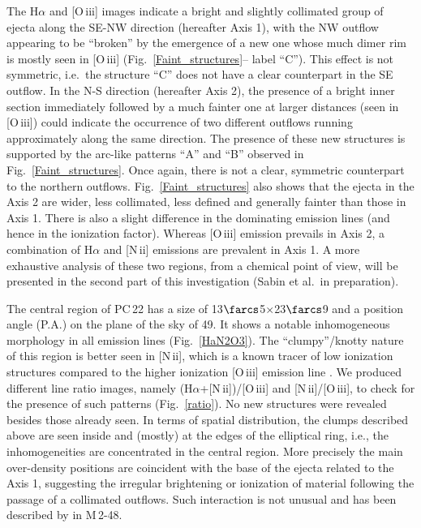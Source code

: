 \documentclass[fleqn,usenatbib,useAMS]{mnras}
\begin{document}
The H$\alpha$ and [O\,{\sc iii}] images indicate a bright and slightly
collimated group of ejecta along the SE-NW direction (hereafter Axis 1),
with the NW outflow appearing to be ``broken'' by the emergence of a new
one whose much dimer rim is mostly seen in [O\,{\sc iii}]
(Fig.~\ref{Faint_structures}-- label ``C'').
This effect is not symmetric, i.e.\ the structure ``C'' does not have a
clear counterpart in the SE outflow.
In the N-S direction (hereafter Axis 2), the presence of a bright inner
section immediately followed by a much fainter one at larger distances
(seen in [O\,{\sc iii}]) could indicate the occurrence of two different
outflows running approximately along the same direction.
The presence of these new structures is supported by the arc-like patterns
``A'' and ``B'' observed in Fig.~\ref{Faint_structures}.
Once again, there is not a clear, symmetric counterpart to the northern
outflows.   
Fig.~\ref{Faint_structures} also shows that the ejecta in the Axis 2
are wider, less collimated, less defined and generally fainter than
those in Axis 1.
There is also a slight difference in the dominating emission lines (and
hence in the ionization factor).
Whereas [O\,{\sc iii}] emission prevails in Axis 2, a combination of
H$\alpha$ and [N\,{\sc ii}] emissions are prevalent in Axis 1.
A more exhaustive analysis of these two regions, from a chemical point
of view, will be presented in the second part of this investigation
(Sabin et al.\ in preparation).


The central region of PC\,22 has a size of 13$\farcs$5$\times$23$\farcs$9
and a position angle (P.A.) on the plane of the sky of 49\degr.
It shows a notable inhomogeneous morphology in all emission lines
(Fig.~\ref{HaN2O3}).
The ``clumpy''/knotty nature of this region is better seen in [N\,{\sc ii}],
which is a known tracer of low ionization structures compared to the higher
ionization [O\,{\sc iii}] emission line \citep{Corradi1996}.
We produced different line ratio images, namely (H$\alpha$+[N\,{\sc ii}])/[O\,{\sc iii}] and [N\,{\sc ii}]/[O\,{\sc iii}], to check for the presence of such patterns (Fig.~\ref{ratio}).
No new structures were revealed besides those already seen.
In terms of spatial distribution, the clumps described above are seen
inside and (mostly) at the edges of the elliptical ring, i.e., the
inhomogeneities are concentrated in the central region.
More precisely the main over-density positions are coincident with the base
of the ejecta related to the Axis 1, suggesting the irregular brightening or
ionization of material following the passage of a collimated outflows.
Such interaction is not unusual and has been described by \citet{Vaz2000}
in M\,2-48. 
\end{document}

